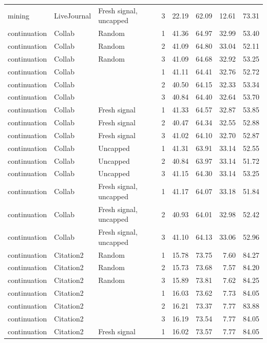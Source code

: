 \begin{table}[t]
\begin{tabular}{lllrrrrr}
mining & LiveJournal & Fresh signal, uncapped & 3 & 22.19 & 62.09 & 12.61 & 73.31 \\
continuation & Collab & Random & 1 & 41.36 & 64.97 & 32.99 & 53.40 \\
continuation & Collab & Random & 2 & 41.09 & 64.80 & 33.04 & 52.11 \\
continuation & Collab & Random & 3 & 41.09 & 64.68 & 32.92 & 53.25 \\
continuation & Collab & \ours{} & 1 & 41.11 & 64.41 & 32.76 & 52.72 \\
continuation & Collab & \ours{} & 2 & 40.50 & 64.15 & 32.33 & 53.34 \\
continuation & Collab & \ours{} & 3 & 40.84 & 64.40 & 32.64 & 53.70 \\
continuation & Collab & Fresh signal & 1 & 41.33 & 64.57 & 32.87 & 53.85 \\
continuation & Collab & Fresh signal & 2 & 40.47 & 64.34 & 32.55 & 52.88 \\
continuation & Collab & Fresh signal & 3 & 41.02 & 64.10 & 32.70 & 52.87 \\
continuation & Collab & Uncapped & 1 & 41.31 & 63.91 & 33.14 & 52.55 \\
continuation & Collab & Uncapped & 2 & 40.84 & 63.97 & 33.14 & 51.72 \\
continuation & Collab & Uncapped & 3 & 41.15 & 64.30 & 33.14 & 53.25 \\
continuation & Collab & Fresh signal, uncapped & 1 & 41.17 & 64.07 & 33.18 & 51.84 \\
continuation & Collab & Fresh signal, uncapped & 2 & 40.93 & 64.01 & 32.98 & 52.42 \\
continuation & Collab & Fresh signal, uncapped & 3 & 41.10 & 64.13 & 33.06 & 52.96 \\
continuation & Citation2 & Random & 1 & 15.78 & 73.75 & 7.60 & 84.27 \\
continuation & Citation2 & Random & 2 & 15.73 & 73.68 & 7.57 & 84.20 \\
continuation & Citation2 & Random & 3 & 15.89 & 73.81 & 7.62 & 84.25 \\
continuation & Citation2 & \ours{} & 1 & 16.03 & 73.62 & 7.73 & 84.05 \\
continuation & Citation2 & \ours{} & 2 & 16.21 & 73.37 & 7.77 & 83.88 \\
continuation & Citation2 & \ours{} & 3 & 16.19 & 73.54 & 7.77 & 84.05 \\
continuation & Citation2 & Fresh signal & 1 & 16.02 & 73.57 & 7.77 & 84.05 \\

\end{tabular}
\end{table}
